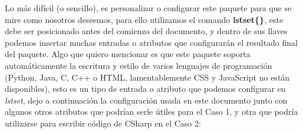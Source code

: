 Lo más difícil (o sencillo), es personalizar o configurar este paquete para que se mire como nosotros deseemos, para ello utilizamos el comando \textbf{lstset\{\}}, este debe ser posicionado antes del comienzo del documento, y dentro de sus llaves podemos insertar muchas entradas o atributos que configurarán el resultado final del paquete. Algo que quiero mencionar es que este paquete soporta automáticamente la escritura y estilo de varios lenguajes de programación (Python, Java, C, C++ o HTML, lamentablemente CSS y JavaScript no están disponibles), esto es un tipo de entrada o atributo que podemos configurar en \textit{lstset}, dejo a continuación la configuración usada en este documento junto con algunos otros atributos que podrían serle útiles para el Caso 1, y otra que podría utilizarse para escribir código de CSharp en el Caso 2:

